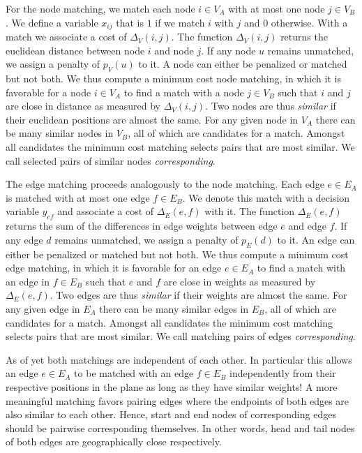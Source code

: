 		For the node matching, we match each node $i \in V_A$ with at most one node $j \in V_B$. We define a variable $x_{ij}$ that is $1$ if we match $i$ with $j$ and $0$ otherwise. With a match we associate a cost of $\Delta_V(i,j)$. The function $\Delta_V(i,j)$ returns the euclidean distance between node $i$ and node $j$. If any node $u$ remains unmatched, we assign a penalty of $p_V(u)$ to it. A node can either be penalized or matched but not both. We thus compute a minimum cost node matching, in which it is favorable for a node $i \in V_A$ to find a match with a node $j \in V_B$ such that $i$ and $j$ are close in distance as measured by $\Delta_V(i,j)$. Two nodes are thus \emph{similar} if their euclidean positions are almost the same. For any given node in $V_A$ there can be many similar nodes in $V_B$, all of which are candidates for a match. Amongst all candidates the minimum cost matching selects pairs that are most similar. We call selected pairs of similar nodes \emph{corresponding}.

		The edge matching proceeds analogously to the node matching. Each edge $e \in E_A$ is matched with at most one edge $f \in E_B$. We denote this match with a decision variable $y_{ef}$ and associate a cost of $\Delta_E(e,f)$ with it. The function $\Delta_E(e,f)$ returns the sum of the differences in edge weights between edge $e$ and edge $f$. If any edge $d$ remains unmatched, we assign a penalty of $p_E(d)$ to it. An edge can either be penalized or matched but not both. We thus compute a minimum cost edge matching, in which it is favorable for an edge $e \in E_A$ to find a match with an edge in $f \in E_B$ such that $e$ and $f$ are close in weights as measured by $\Delta_E(e,f)$. Two edges are thus \emph{similar} if their weights are almost the same. For any given edge in $E_A$ there can be many similar edges in $E_B$, all of which are candidates for a match. Amongst all candidates the minimum cost matching selects pairs that are most similar. We call matching pairs of edges \emph{corresponding}.

		As of yet both matchings are independent of each other. In particular this allows an edge $e \in E_A$ to be matched with an edge $f \in E_B$ independently from their respective positions in the plane as long as they have similar weights! A more meaningful matching favors pairing edges where the endpoints of both edges are also similar to each other. Hence, start and end nodes of corresponding edges should be pairwise corresponding themselves. In other words, head and tail nodes of both edges are geographically close respectively. 


